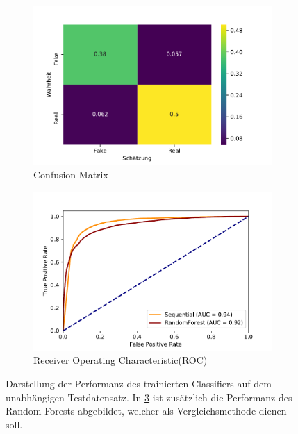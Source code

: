 \begin{figure}[t!]
    \centering
    \begin{subfigure}[t]{0.49\textwidth}
        \centering
        \includegraphics[width=\textwidth]{pictures/cnfsn_mtx_bow_best_nn.pdf}
        \caption{Confusion Matrix}
        \label{fig:CM}
    \end{subfigure}
    \begin{subfigure}[t]{0.49\textwidth}
        \centering
        \includegraphics[width=\textwidth]{pictures/roc_comparison.pdf}
        \caption{Receiver Operating Characteristic(ROC)}
        \label{fig:ROC}
    \end{subfigure}
    \caption{Darstellung der Performanz des trainierten Classifiers auf dem unabhängigen Testdatensatz. In \ref{fig:ROC}
            ist zusätzlich die Performanz des Random Forests abgebildet, welcher als Vergleichsmethode dienen soll.}
\end{figure}

